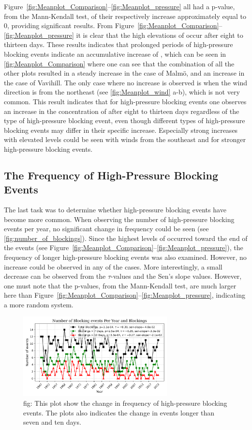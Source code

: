 Figure~\ref{fig:Meanplot_Comparison}--\ref{fig:Meanplot_pressure} all had a p-value, from the Mann-Kendall test, of their respectively increase approximately equal to 0, providing significant results. From Figure~\ref{fig:Meanplot_Comparison}--\ref{fig:Meanplot_pressure} it is clear that the high elevations of \PM occur after eight to thirteen days. These results indicates that prolonged periods of high-pressure blocking events indicate an accumulative increase of \PM, which can be seen in \autoref{fig:Meanplot_Comparison} where one can see that the combination of all the other plots resulted in a steady increase in the case of Malmö, and an increase in the case of Vavihill. The only case where no increase is observed is when the wind direction is from the northeast (see \autoref{fig:Meanplot_wind} a-b), which is not very common. This result indicates that for high-pressure blocking events one observes an increase in the concentration of \PM after eight to thirteen days regardless of the type of high-pressure blocking event, even though different types of high-pressure blocking events may differ in their specific increase. Especially strong increases with elevated \PM levels could be seen with winds from the southeast and for stronger high-pressure blocking events. 

\subsection{The Frequency of High-Pressure Blocking Events}
The last task was to determine whether high-pressure blocking events have become more common. When observing the number of high-pressure blocking events per year, no significant change in frequency could be seen (see \autoref{fig:number_of_blockings}). Since the highest levels of \PM  occurred toward the end of the events (see Figure~\ref{fig:Meanplot_Comparison}--\ref{fig:Meanplot_pressure}), the frequency of longer high-pressure blocking events was also examined. However, no increase could be observed in any of the cases. More interestingly, a small decrease can be observed from the $\tau$-values and the Sen's slope values. However, one must note that the p-values, from the Mann-Kendall test, are much larger here than Figure~\ref{fig:Meanplot_Comparison}--\ref{fig:Meanplot_pressure}, indicating a more random system. 

\begin{figure}[H]
    \centering
    \includegraphics[width=0.7\textwidth]{Figures/BlockingsPerYear.png}
    \caption{fig: This plot show the change in frequency of high-pressure blocking events. The plots also indicates the change in events longer than seven and ten days. }
    \label{fig:number_of_blockings}
\end{figure}

